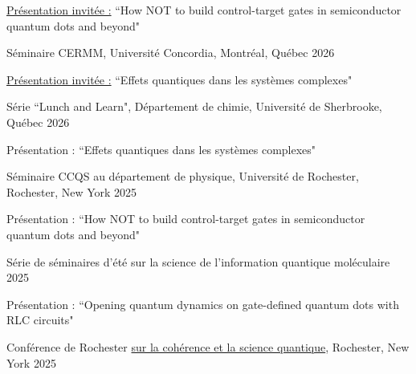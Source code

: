 \documentclass[margin,line]{res}
\newenvironment{list1}{
 \begin{list}{\ding{113}}{%
  \setlength{\itemsep}{0in}
  \setlength{\parsep}{0in} \setlength{\parskip}{0in}
  \setlength{\topsep}{0in} \setlength{\partopsep}{0in} 
  \setlength{\leftmargin}{0.17in}}}{\end{list}}
\begin{document}
\begin{resume}
\begin{list1}
\item[]\underline{Présentation invitée :} ``How NOT to build control-target gates in semiconductor quantum dots and beyond"
\end{list1}

\vspace*{-1mm}

Séminaire CERMM, Université Concordia, Montréal, Québec \hfill{2026}

\begin{list1}
\item[]\underline{Présentation invitée :} ``Effets quantiques dans les systèmes complexes"
\end{list1}

\vspace*{-1mm}

Série ``Lunch and Learn", Département de chimie, Université de Sherbrooke, Québec \hfill{2026}

\begin{list1}
\item[]Présentation : ``Effets quantiques dans les systèmes complexes"
\end{list1}

\vspace*{-1mm}

Séminaire CCQS au département de physique, Université de Rochester, Rochester, New York \hfill{2025}

\begin{list1}
\item[]Présentation : ``How NOT to build control-target gates in semiconductor quantum dots and beyond"
\end{list1}

\vspace*{-1mm}

Série de séminaires d'été sur la science de l'information quantique moléculaire \hfill{2025}

\begin{list1}
\item[]Présentation : ``Opening quantum dynamics on gate-defined quantum dots with RLC circuits"
\end{list1}

\vspace*{-1mm}

Conférence de Rochester \href{https://www.sas.rochester.edu/quantum/cqs/cqs-12.html}{sur la cohérence et la science quantique}, Rochester, New York \hfill{2025}


\end{resume}
\end{document}
